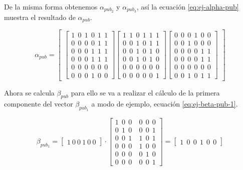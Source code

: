 De la misma forma obtenemos $\alpha_{pub_2}$ y $\alpha_{pub_3}$, así la ecuación \ref{eq:ej-alpha-pub} muestra el resultado de $\alpha_{pub}$.


\begin{equation}\label{eq:ej-alpha-pub}
{\alpha_{pub}} = \left[
	\begin{array}{c}
	\left[\begin{array}{c}
		1\ \ 0\ \ 1\ \ 0\ \ 1\ \ 1\\
		0\ \ 0\ \ 0\ \ 0\ \ 1\ \ 1\\
		0\ \ 0\ \ 0\ \ 1\ \ 1\ \ 1\\
		0\ \ 0\ \ 0\ \ 1\ \ 1\ \ 1\\
		0\ \ 0\ \ 0\ \ 0\ \ 0\ \ 0\\
		0\ \ 0\ \ 0\ \ 1\ \ 0\ \ 0
	\end{array}\right]
		
	\left[\begin{array}{c}
		1\ \ 1\ \ 0\ \ 1\ \ 1\ \ 1\\
		0\ \ 0\ \ 1\ \ 0\ \ 1\ \ 1\\
		0\ \ 0\ \ 1\ \ 0\ \ 1\ \ 0\\
		0\ \ 0\ \ 1\ \ 0\ \ 1\ \ 0\\
		0\ \ 0\ \ 0\ \ 0\ \ 0\ \ 0\\
		0\ \ 0\ \ 0\ \ 0\ \ 0\ \ 1
	\end{array}\right]
	
	\left[\begin{array}{c}
		0\ \ 0\ \ 0\ \ 1\ \ 0\ \ 0\\
		0\ \ 0\ \ 1\ \ 0\ \ 0\ \ 0\\
		0\ \ 0\ \ 0\ \ 0\ \ 1\ \ 1\\
		0\ \ 0\ \ 0\ \ 0\ \ 1\ \ 1\\
		0\ \ 0\ \ 0\ \ 0\ \ 0\ \ 0\\
		0\ \ 0\ \ 1\ \ 0\ \ 1\ \ 1
	\end{array}\right]
	\end{array}
	\right]
\end{equation}

Ahora se calcula $\beta_{pub}$ para ello se va a realizar el cálculo de la primera componente del vector $\beta_{pub_1}$ a modo de ejemplo, ecuación \ref{eq:ej-beta-pub-1}.

\begin{equation}\label{eq:ej-beta-pub-1}
	{\beta_{pub_1}} = 
	\left[\begin{array}{c}
		1\ 0\ 0\ 1\ 0\ 0
	\end{array}\right] \cdot
	\left[\begin{array}{c|c}
		1\ \ 0\ \ 0\ & 0\ \ 0\ \ 0\\
		0\ \ 1\ \ 0\ & 0\ \ 0\ \ 1\\
		0\ \ 0\ \ 1\ & 1\ \ 0\ \ 1\\
		\hline
		0\ \ 0\ \ 0\ & 1\ \ 0\ \ 0\\
		0\ \ 0\ \ 0\ & 0\ \ 1\ \ 0\\
		0\ \ 0\ \ 0\ & 0\ \ 0\ \ 1
	\end{array}\right] =
	\left[\begin{array}{c}
	1\ \ 0\ \ 0\ \ 1\ \ 0\ \ 0
	\end{array}\right]
\end{equation}

